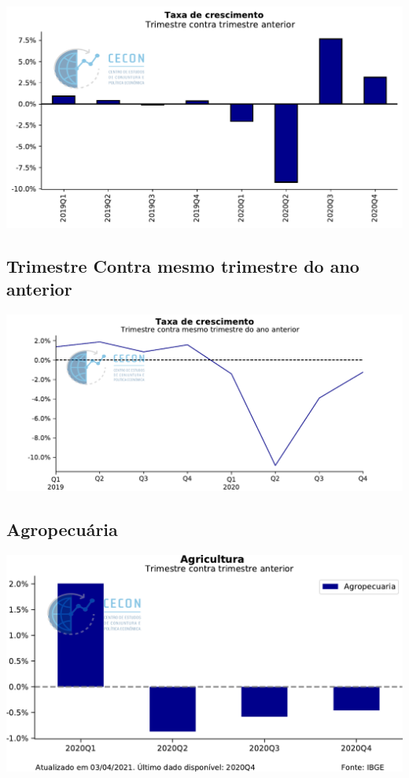 \documentclass{SelfArx}
\begin{document}
\begin{center}
\includegraphics[width=.9\linewidth]{./figs/PIB/PIB.pdf}
\end{center}

\subsection*{Trimestre Contra mesmo trimestre do ano anterior}
\label{sec:org1bb6689}

\begin{center}
\includegraphics[width=.9\linewidth]{./figs/PIB/PIB_YoY.pdf}
\end{center}

\subsection*{Agropecuária}
\label{sec:org2c2961f}

\begin{center}
\includegraphics[width=.9\linewidth]{./figs/PIB/Agropecuaria.pdf}
\end{center}
\end{document}
